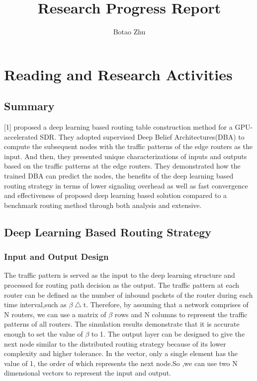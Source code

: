 \documentclass[11pt]{report}
\title{Research Progress Report}
\author{Botao Zhu}
\begin{document}
	
	\maketitle
	
	 \chead{} 
	 \cfoot{} 
	\renewcommand{\footrulewidth}{1.0pt}
	\renewcommand{\headrulewidth}{2.0pt}
	\renewcommand{\arraystretch}{1.3}
	\pagestyle{fancy}
	
	\renewcommand{\thesection}{\arabic{section}}
	
	\section{Reading and Research Activities}
	
	\subsection{Summary}
	[1] proposed a deep learning based routing table construction method for a GPU-accelerated SDR. They adopted supervised Deep Belief Architectures(DBA) to compute the subsequent nodes with the traffic patterns of the edge routers as the input. And then, they presented unique characterizations of inputs and outputs based on the traffic patterns at the edge routers. They demonstrated how the trained DBA can predict the nodes, the benefits of the deep learning based routing strategy in terms of lower signaling overhead as well as fast convergence and effectiveness of proposed deep learning based solution compared to a benchmark routing method through both analysis and extensive.  
	
	\subsection{Deep Learning Based Routing Strategy}
	\subsubsection{Input and Output Design}
    The traffic pattern is served as the input to the deep learning structure and processed for routing path decision as the output. The traffic pattern at each router can be defined as the number of inbound packets of the router during each time interval,such as $\beta\bigtriangleup$t. Therefore, by assuming that a network comprises of N routers, we can use a matrix of $\beta$ rows and N columns to represent the traffic patterns of all routers. The simulation results demonstrate that it is accurate enough to set the value of $\beta$ to 1. The output layer can be designed to give the next node similar to the distributed routing strategy because of its lower complexity and higher tolerance. In the vector, only a single element has the value of 1, the order of which represents the next node.So ,we can use two N dimensional vectors to represent the input and output.
	
\end{document}
